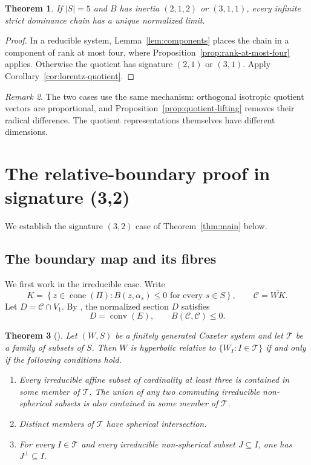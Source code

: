 \documentclass[11pt,reqno]{amsart}
\theoremstyle{plain}
\newtheorem{theorem}{Theorem}[section]
\theoremstyle{definition}
\theoremstyle{remark}
\newtheorem{remark}[theorem]{Remark}
\numberwithin{equation}{section}
\begin{document}
\begin{theorem}\label{thm:rank5-lorentz-quotients}
If $|S|=5$ and $B$ has inertia $(2,1,2)$ or $(3,1,1)$, every infinite strict dominance chain has a unique normalized limit.
\end{theorem}
\begin{proof}
In a reducible system, Lemma~\ref{lem:components} places the chain in a component of rank at most four, where Proposition~\ref{prop:rank-at-most-four} applies. Otherwise the quotient has signature $(2,1)$ or $(3,1)$. Apply Corollary~\ref{cor:lorentz-quotient}.
\end{proof}

\begin{remark}
The two cases use the same mechanism: orthogonal isotropic quotient vectors are proportional, and Proposition~\ref{prop:quotient-lifting} removes their radical difference. The quotient representations themselves have different dimensions.
\end{remark}

\section{The relative-boundary proof in signature (3,2)}\label{sec:signature-32}

We establish the signature $(3,2)$ case of Theorem~\ref{thm:main} below.

\subsection{The boundary map and its fibres}\label{subsec:32-fibres}

We first work in the irreducible case. Write
\[
    K=
    \left\{
        z\in\operatorname{cone}(\Pi):
        B(z,\alpha_s)\leq0\text{ for every }s\in S
    \right\},
    \qquad
    \mathcal C=\overline{WK}.
\]
Let $D=\mathcal C\cap V_1$. By \cite[Theorem~2.2]{DHR}, the normalized section $D$ satisfies
\[
    D=\operatorname{conv}(E),
    \qquad
    B(\mathcal C,\mathcal C)\leq0.
\]
\begin{theorem}[{\cite[Theorem~A$'$]{CapraceErratum}}]\label{thm:caprace-relative}
Let $(W,S)$ be a finitely generated Coxeter system and let $\mathcal T$ be a family of subsets of $S$.
Then $W$ is hyperbolic relative to $\{W_I:I\in\mathcal T\}$ if and only if the following conditions hold.
\begin{enumerate}[label=\textup{(RH\arabic*)}]
    \item Every irreducible affine subset of cardinality at least three is contained in some member of $\mathcal T$. The union of any two commuting irreducible non-spherical subsets is also contained in some member of $\mathcal T$.
    \item Distinct members of $\mathcal T$ have spherical intersection.
    \item For every $I\in\mathcal T$ and every irreducible non-spherical subset $J\subseteq I$, one has $J^\perp\subseteq I$.
\end{enumerate}
\end{theorem}
\end{document}
